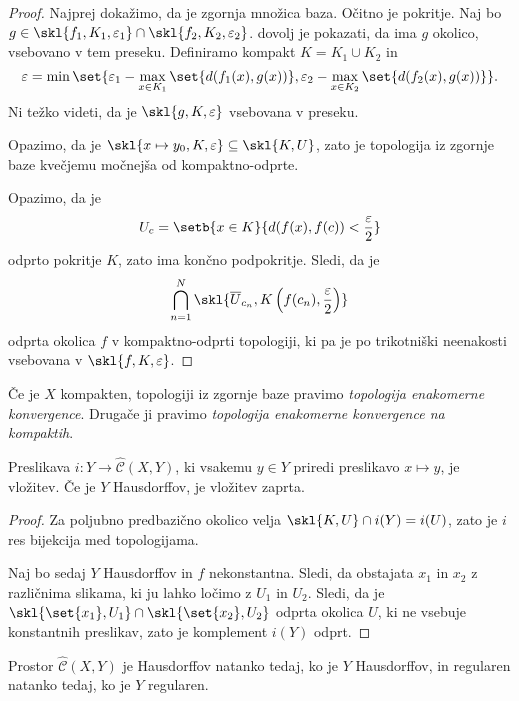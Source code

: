 \begin{proof}
Najprej dokažimo, da je zgornja množica baza. Očitno je pokritje.
Naj bo
$g \in
\skl{f_1,K_1,\varepsilon_1} \cap \skl{f_2,K_2,\varepsilon_2}$.
dovolj je pokazati, da ima $g$ okolico, vsebovano v tem preseku.
Definiramo kompakt $K = K_1 \cup K_2$ in
\[
\varepsilon =
\min \set{
\varepsilon_1 - \max_{x \in K_1} \set{d(f_1(x), g(x))},
\varepsilon_2 - \max_{x \in K_2} \set{d(f_2(x), g(x))}
}.
\]
Ni težko videti, da je $\skl{g,K,\varepsilon}$ vsebovana v preseku.

Opazimo, da je
$\skl{x \mapsto y_0,K,\varepsilon} \subseteq \skl{K,U}$, zato je
topologija iz zgornje baze kvečjemu močnejša od kompaktno-odprte.

Opazimo, da je
\[
U_c = \setb{x \in K}{d(f(x),f(c)) < \frac{\varepsilon}{2}}
\]
odprto pokritje $K$, zato ima končno podpokritje. Sledi, da je
\[
\bigcap_{n=1}^N \skl{
\overline{U}_{c_n},
K\left(f(c_n), \frac{\varepsilon}{2}\right)
}
\]
odprta okolica $f$ v kompaktno-odprti topologiji, ki pa je po
trikotniški neenakosti vsebovana v $\skl{f,K,\varepsilon}$.
\end{proof}

\begin{opomba}
Če je $X$ kompakten, topologiji iz zgornje baze pravimo
\emph{topologija enakomerne konvergence}. Drugače ji pravimo
\emph{topologija enakomerne konvergence na kompaktih}.
\end{opomba}

\begin{trditev}
Preslikava $i \colon Y \to \widehat{\mathcal{C}}(X,Y)$, ki vsakemu
$y \in Y$ priredi preslikavo $x \mapsto y$, je vložitev. Če je $Y$
Hausdorffov, je vložitev zaprta.
\end{trditev}

\begin{proof}
Za poljubno predbazično okolico velja $\skl{K,U} \cap i(Y) = i(U)$,
zato je $i$ res bijekcija med topologijama.

Naj bo sedaj $Y$ Hausdorffov in $f$ nekonstantna. Sledi, da
obstajata $x_1$ in $x_2$ z različnima slikama, ki ju lahko ločimo z
$U_1$ in $U_2$. Sledi, da je
$\skl{\set{x_1},U_1} \cap \skl{\set{x_2},U_2}$ odprta okolica $U$,
ki ne vsebuje konstantnih preslikav, zato je komplement $i(Y)$
odprt.
\end{proof}

\begin{trditev}
Prostor $\widehat{\mathcal{C}}(X,Y)$ je Hausdorffov natanko tedaj,
ko je $Y$ Hausdorffov, in regularen natanko tedaj, ko je $Y$
regularen.
\end{trditev}

